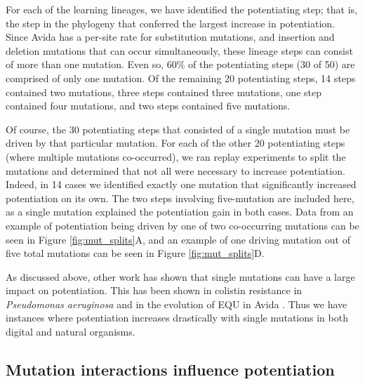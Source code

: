 For each of the learning lineages, we have identified the potentiating step; that is, the step in the phylogeny that conferred the largest increase in potentiation. 
Since Avida has a per-site rate for substitution mutations, and insertion and deletion mutations that can occur simultaneously, these lineage steps can consist of more than one mutation. 
Even so, 60\% of the potentiating steps (30 of 50) are comprised of only one mutation. 
Of the remaining 20 potentiating steps, 14 steps contained two mutations, three steps contained three mutations, one step contained four mutations, and two steps contained five mutations. 

Of course, the 30 potentiating steps that consisted of a single mutation must be driven by that particular mutation. 
For each of the other 20 potentiating steps (where multiple mutations co-occurred), we ran replay experiments to split the mutations and determined that not all were necessary to increase potentiation. 
Indeed, %
in 14 cases we identified exactly one mutation that significantly increased potentiation on its own. 
The two steps involving five-mutation are included here, as a single mutation explained the potentiation gain in both cases. 
Data from an example of potentiation being driven by one of two co-occurring mutations can be seen in Figure \ref{fig:mut_splits}A, and an example of one driving mutation out of five total mutations can be seen in Figure \ref{fig:mut_splits}D. 

As discussed above, other work has shown that single mutations can have a large impact on potentiation. 
This has been shown in colistin resistance in \textit{Pseudomonas aeruginosa} \citep{jochumsenEvolutionAntimicrobialPeptide2016a} and in the evolution of EQU in Avida \citep{covertiiiExperimentsRoleDeleterious2013}.
Thus we have instances where potentiation increases drastically with single mutations in both digital and natural organisms. 


\subsection{Mutation interactions influence potentiation}


